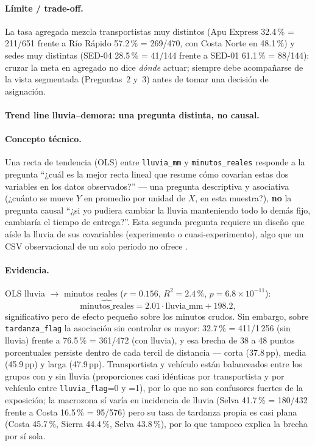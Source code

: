 \paragraph{Límite / trade-off.} La tasa agregada mezcla transportistas muy distintos (Apu Express 32.4\,\% = 211/651 frente a Río Rápido 57.2\,\% = 269/470, con Costa Norte en 48.1\,\%) y sedes muy distintas (SED-04 28.5\,\% = 41/144 frente a SED-01 61.1\,\% = 88/144): cruzar la meta en agregado no dice \emph{dónde} actuar; siempre debe acompañarse de la vista segmentada (Preguntas~2 y~3) antes de tomar una decisión de asignación.

\paragraph{Trend line lluvia--demora: una pregunta distinta, no causal.}

\paragraph{Concepto técnico.} Una recta de tendencia (OLS) entre \lstinline|lluvia_mm| y \lstinline|minutos_reales| responde a la pregunta ``¿cuál es la mejor recta lineal que resume cómo covarían estas dos variables en los datos observados?'' --- una pregunta descriptiva y asociativa (¿cuánto se mueve $Y$ en promedio por unidad de $X$, en esta muestra?), \textbf{no} la pregunta causal ``¿si yo pudiera cambiar la lluvia manteniendo todo lo demás fijo, cambiaría el tiempo de entrega?''. Esta segunda pregunta requiere un diseño que aísle la lluvia de sus covariables (experimento o cuasi-experimento), algo que un CSV observacional de un solo periodo no ofrece \citep{anscombe1973graphs}.

\paragraph{Evidencia.} OLS lluvia $\to$ minutos reales ($r=0.156$, $R^2=2.4$\,\%, $p=6.8\times 10^{-11}$):
\[
\widehat{\text{minutos\_reales}} = 2.01 \cdot \text{lluvia\_mm} + 198.2 ,
\]
significativo pero de efecto pequeño sobre los minutos crudos. Sin embargo, sobre \lstinline|tardanza_flag| la asociación sin controlar es mayor: 32.7\,\% = 411/1\,256 (sin lluvia) frente a 76.5\,\% = 361/472 (con lluvia), y esa brecha de 38 a 48 puntos porcentuales persiste dentro de cada tercil de distancia --- corta (37.8\,pp), media (45.9\,pp) y larga (47.9\,pp). Transportista y vehículo están balanceados entre los grupos con y sin lluvia (proporciones casi idénticas por transportista y por vehículo entre \lstinline|lluvia_flag|=0 y =1), por lo que no son confusores fuertes de la exposición; la macrozona sí varía en incidencia de lluvia (Selva 41.7\,\% = 180/432 frente a Costa 16.5\,\% = 95/576) pero su tasa de tardanza propia es casi plana (Costa 45.7\,\%, Sierra 44.4\,\%, Selva 43.8\,\%), por lo que tampoco explica la brecha por sí sola.


